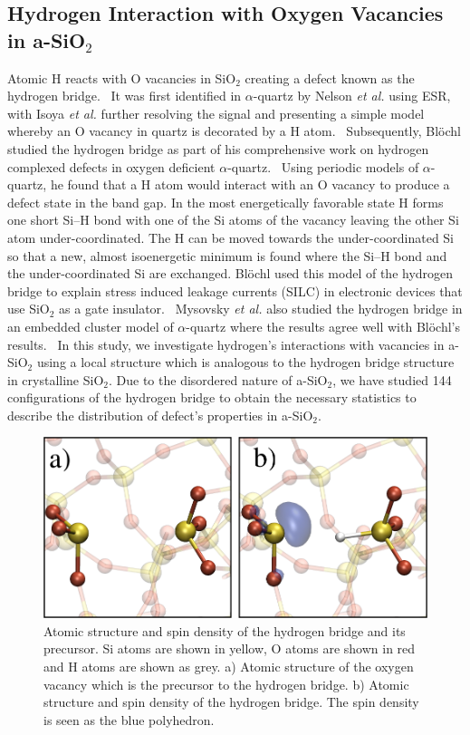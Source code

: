 \documentclass[aps,prb,reprint,superscriptaddress,showpacs]{revtex4-1}
\begin{document}
\subsection{Hydrogen Interaction with Oxygen Vacancies in a-SiO$_2$}
\label{sec:vacancies}

Atomic H reacts with O vacancies in SiO$_2$ creating a defect known as the hydrogen bridge.~\cite{eprime_4_1,eprime_4_2,blochl_vacancies,mysovsky_pov,VANGINHOVEN06} It was first identified in $\alpha$-quartz by Nelson \emph{et al.} using ESR,~\cite{eprime_4_2} with Isoya \emph{et al.} further resolving the signal and presenting a simple model whereby an O vacancy in quartz is decorated by a H atom.~\cite{eprime_4_1} Subsequently, Bl\"{o}chl studied the hydrogen bridge as part of his comprehensive work on hydrogen complexed defects in oxygen deficient $\alpha$-quartz.~\cite{blochl_vacancies} Using periodic models of $\alpha$-quartz, he found that a H atom would interact with an O vacancy to produce a defect state in the band gap. In the most energetically favorable state H forms one short \mbox{Si--H} bond with one of the Si atoms of the vacancy leaving the other Si atom under-coordinated. The H can be moved towards the under-coordinated Si so that a new, almost isoenergetic minimum is found where the \mbox{Si--H} bond and the under-coordinated Si are exchanged. Bl\"{o}chl used this model of the hydrogen bridge to explain stress induced leakage currents (SILC) in electronic devices that use SiO$_2$ as a gate insulator.~\cite{BLOECHL99} Mysovsky \emph{et al.} also studied the hydrogen bridge in an embedded cluster model of $\alpha$-quartz where the results agree well with Bl\"{o}chl's results.~\cite{mysovsky_pov} In this study, we investigate hydrogen's interactions with vacancies in a-SiO$_2$ using a local structure which is analogous to the hydrogen bridge structure in crystalline SiO$_2$. Due to the disordered nature of a-SiO$_2$, we have studied 144 configurations of the hydrogen bridge to obtain the necessary statistics to describe the distribution of defect's properties in a-SiO$_2$.

\begin{figure}[h!]
\includegraphics{hydrogen_bridge_configurations2.png}
\caption{Atomic structure and spin density of the hydrogen bridge and its precursor. Si atoms are shown in yellow, O atoms are shown in red and H atoms are shown as grey. a) Atomic structure of the oxygen vacancy which is the precursor to the hydrogen bridge. b) Atomic structure and spin density of the hydrogen bridge. The spin density is seen as the blue polyhedron.}
\label{fig:h_bridge}
\end{figure}
\end{document}
